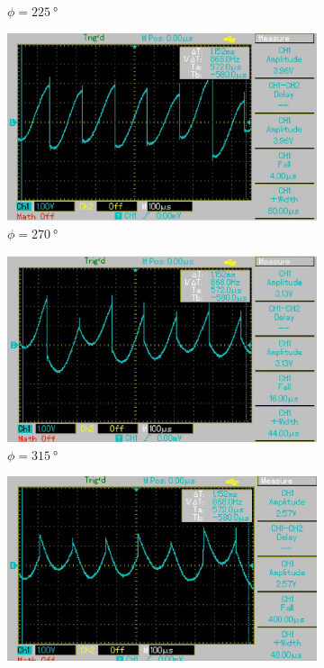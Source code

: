 \begin{figure}[H]
\begin{subfigure}{0.3\textwidth}
    \caption{$\phi = \SI{225}{\degree}$}
  \end{subfigure}
  \begin{subfigure}{0.3\textwidth}
    \centering
    \includegraphics[width=\textwidth]{build/270.jpg}
    \caption{$\phi = \SI{270}{\degree}$}
  \end{subfigure}
  \begin{subfigure}{0.3\textwidth}
    \centering
    \includegraphics[width=\textwidth]{build/315.jpg}
    \caption{$\phi = \SI{315}{\degree}$}
  \end{subfigure}
  \begin{subfigure}{0.3\textwidth}
    \centering
    \includegraphics[width=\textwidth]{build/360.jpg}

\end{subfigure}
\end{figure}
